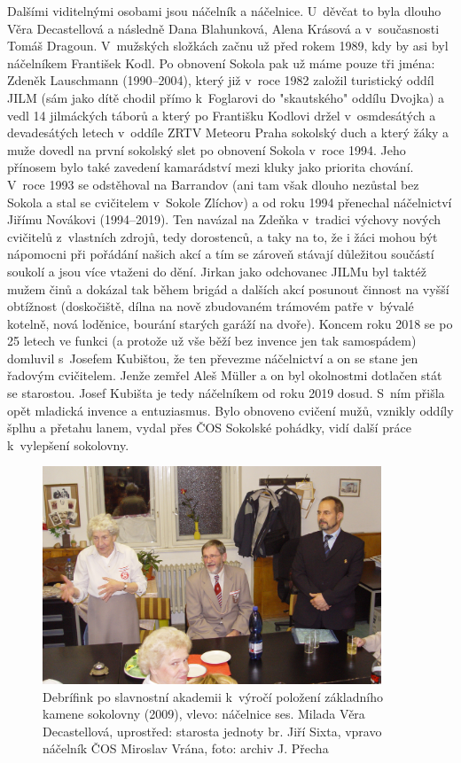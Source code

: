 \documentclass[a5paper, 11pt, twoside]{article}
\begin{document}
{\sloppy Dalšími viditelnými osobami jsou náčelník a náčelnice. U~děvčat to byla dlouho Věra Decastellová a následně Dana Blahunková, Alena Krásová a
v~současnosti Tomáš Dragoun. V~mužských složkách začnu už před rokem 1989,
kdy by asi byl náčelníkem František Kodl. Po obnovení Sokola pak už máme
pouze tři jména: Zdeněk Lauschmann (1990--2004), který již v~roce 1982
založil turistický oddíl JILM (sám jako dítě chodil přímo k~Foglarovi do
"skautského" oddílu Dvojka) a vedl 14 jilmáckých táborů a který po
Františku Kodlovi držel v~osmdesátých a devadesátých letech v~oddíle
ZRTV Meteoru Praha sokolský duch a který žáky a muže dovedl na první
sokolský slet po obnovení Sokola v~roce 1994. Jeho přínosem bylo také
zavedení kamarádství mezi kluky jako priorita chování. V~roce 1993 se
odstěhoval na Barrandov (ani tam však dlouho nezůstal bez Sokola a stal
se cvičitelem v~Sokole Zlíchov) a od roku 1994 přenechal náčelnictví
Jiřímu Novákovi (1994--2019). Ten navázal na Zdeňka
v~tradici výchovy nových cvičitelů z~vlastních zdrojů, tedy dorostenců, a
taky na to, že i žáci mohou být nápomocni při pořádání našich akcí a tím
se zároveň stávají důležitou součástí soukolí a jsou více vtaženi do
dění. Jirkan jako odchovanec JILMu byl taktéž mužem činů a dokázal tak
během brigád a dalších akcí posunout činnost na vyšší obtížnost
(doskočiště, dílna na nově zbudovaném trámovém patře v~bývalé kotelně,
nová loděnice, bourání starých garáží na dvoře). Koncem roku 2018 se po
25 letech ve funkci (a protože už vše běží bez invence jen tak
samospádem) domluvil s~Josefem Kubištou, že ten převezme náčelnictví a
on se stane jen řadovým cvičitelem. Jenže zemřel Aleš Müller a on byl
okolnostmi dotlačen stát se starostou. Josef Kubišta je tedy náčelníkem
od roku 2019 dosud. S~ním přišla opět mladická invence a entuziasmus.
Bylo obnoveno cvičení mužů, vznikly oddíly šplhu a přetahu lanem, vydal
přes ČOS Sokolské pohádky, vidí další práce k~vylepšení sokolovny.\par}

\begin{figure}[h!]
  \centering 
  \includegraphics[width=0.9\textwidth]{img/49_debrifink.JPG}
  \caption*{Debrífink po slavnostní akademii k~výročí položení základního
  kamene sokolovny (2009), vlevo: náčelnice ses. Milada Věra Decastellová,
  uprostřed: starosta jednoty br. Jiří Sixta, vpravo náčelník ČOS Miroslav
  Vrána, foto: archiv J. Přecha}
\end{figure}
\end{document}

